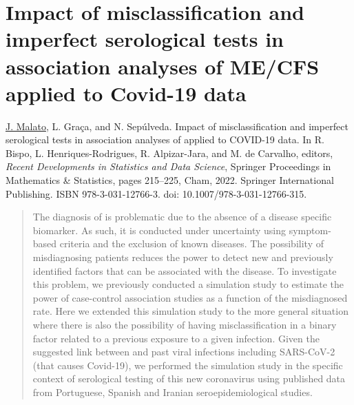 \chapter{Impact of misclassification and imperfect serological tests in association analyses of ME/CFS applied to Covid-19 data}
\label{chapter:misdiagnosis-serology-2022}



\noindent\underline{J. Malato}, L. Graça, and N. Sepúlveda. Impact of misclassification and imperfect serological tests in association analyses of \cfs applied to COVID-19 data. In R. Bispo, L. Henriques-Rodrigues, R. Alpizar-Jara, and M. de Carvalho, editors, \textit{Recent Developments in Statistics and Data Science}, Springer Proceedings in Mathematics \& Statistics, pages 215--225, Cham, 2022. Springer International Publishing. ISBN 978-3-031-12766-3. doi: 10.1007/978-3-031-12766-315.

\begin{abstract}
The diagnosis of \cfs is problematic due to the absence of a disease specific biomarker.
As such, it is conducted under uncertainty using symptom-based criteria and the exclusion of known diseases.
The possibility of misdiagnosing patients reduces the power to detect new and previously identified factors that can be associated with the disease.
To investigate this problem, we previously conducted a simulation study to estimate the power of case-control association studies as a function of the misdiagnosed rate.
Here we extended this simulation study to the more general situation where there is also the possibility of having misclassification in a binary factor related to a previous exposure to a given infection.
Given the suggested link between \cfs and past viral infections including SARS-CoV-2 (that causes Covid-19), we performed the simulation study in the specific context of serological testing of this new coronavirus using published data from Portuguese, Spanish and Iranian seroepidemiological studies.
\end{abstract}

